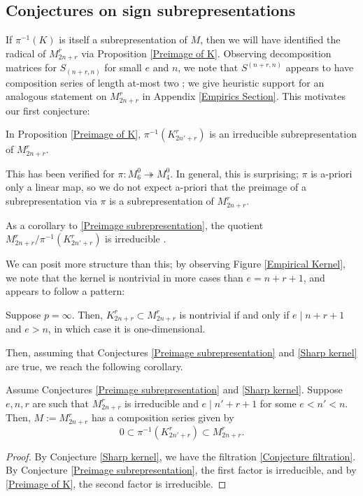 \documentclass{amsart}
\begin{document}
 \subsection{Conjectures on sign subrepresentations}\label{Conjecture Section}
 If $\pi^{-1}(K)$ is itself a subrepresentation of $M$, then we will have identified the radical of $M_{2n + r}^r$ via Proposition \ref{Preimage of K}.
 Observing decomposition matrices for $S_{(n+r,n)}$ for small $e$ and $n$, we note that $S^{(n+r,n)}$ appears to have composition series of length at-most two \cite[~Appendix~B]{Mathas-book};
 we give heuristic support for an analogous statement on $M_{2n + r}^r$ in Appendix \ref{Empirics Section}.
 This motivates our first conjecture:
 \begin{conjecture}\label{Preimage subrepresentation}
   In Proposition \ref{Preimage of K}, $\pi^{-1}(K_{2n' + r}^r)$ is an irreducible subrepresentation of $M_{2n + r}^r$.
 \end{conjecture}
 This has been verified for $\pi:M_6^0 \twoheadrightarrow M_4^0$.
 In general, this is surprising;
 $\pi$ is a-priori only a linear map, so we do not expect a-priori that the preimage of a subrepresentation via $\pi$ is a subrepresentation of $M_{2n + r}^r$.
  
  \begin{remark}
    As a corollary to \ref{Preimage subrepresentation}, the quotient $M_{2n + r}^r / \pi^{-1}(K_{2n' + r}^r)$ is irreducible \cite[Thm.~10.4]{Dummit}.
  \end{remark}

  We can posit more structure than this;
 by observing Figure \ref{Empirical Kernel}, we note that the kernel is nontrivial in more cases than $e = n + r + 1$, and appears to follow a pattern: 
 \begin{conjecture}\label{Sharp kernel}
 	Suppose $p = \infty$.
  Then, $K_{2n + r}^r \subset M_{2n + r}^r$ is nontrivial if and only if $e \mid n + r + 1$ and $e > n$, in which case it is one-dimensional.
 \end{conjecture} 
 Then, assuming that Conjectures \ref{Preimage subrepresentation} and \ref{Sharp kernel} are true, we reach the following corollary.
 \begin{corollary}
  Assume Conjectures \ref{Preimage subrepresentation} and \ref{Sharp kernel}.
 	Suppose $e,n,r$ are such that $M_{2n + r}^r$ is irreducible and $e \mid n' + r + 1$ for some $e < n' < n$.
 	Then, $M := M_{2n + r}^r$ has a composition series given by \begin{equation}\label{Conjecture filtration}
    0 \subset \pi^{-1}(K_{2n' + r}^r) \subset M_{2n + r}^r.\end{equation}
 \end{corollary}
 \begin{proof}
 	By Conjecture \ref{Sharp kernel}, we have the filtration \eqref{Conjecture filtration}.
 	By Conjecture \ref{Preimage subrepresentation}, the first factor is irreducible, and by \ref{Preimage of K}, the second factor is irreducible.
 \end{proof}
 
\end{document}
